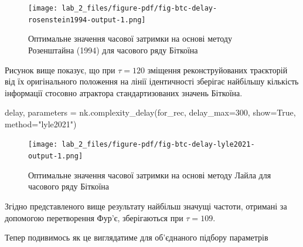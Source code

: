 \documentclass[
  letterpaper,
]{report}
\newenvironment{Shaded}{\begin{snugshade}}{\end{snugshade}}
\newcommand{\DecValTok}[1]{\textcolor[rgb]{0.68,0.00,0.00}{#1}}
\newcommand{\NormalTok}[1]{\textcolor[rgb]{0.00,0.23,0.31}{#1}}
\newcommand{\OperatorTok}[1]{\textcolor[rgb]{0.37,0.37,0.37}{#1}}
\newcommand{\StringTok}[1]{\textcolor[rgb]{0.13,0.47,0.30}{#1}}
\newcommand{\VariableTok}[1]{\textcolor[rgb]{0.07,0.07,0.07}{#1}}
\begin{document}
\begin{figure}[H]

{\centering \texttt{[image: lab\_2\_files/figure-pdf/fig-btc-delay-rosenstein1994-output-1.png]}

}

\caption{\label{fig-btc-delay-rosenstein1994}Оптимальне значення часової
затримки на основі методу Розенштайна (1994) для часового ряду Біткоїна}

\end{figure}

Рисунок вище показує, що при \(\tau=120\) зміщення реконструйованих
траєкторій від їх оригінального положення на лінії ідентичності зберігає
найбільшу кількість інформації стосовно атрактора стандартизованих
значень Біткоїна.

\begin{Shaded}
\begin{Highlighting}[]
\NormalTok{delay, parameters }\OperatorTok{=}\NormalTok{ nk.complexity\_delay(for\_rec, }
\NormalTok{                                        delay\_max}\OperatorTok{=}\DecValTok{300}\NormalTok{, show}\OperatorTok{=}\VariableTok{True}\NormalTok{,}
\NormalTok{                                        method}\OperatorTok{=}\StringTok{"lyle2021"}\NormalTok{)}
\end{Highlighting}
\end{Shaded}

\begin{figure}[H]

{\centering \texttt{[image: lab\_2\_files/figure-pdf/fig-btc-delay-lyle2021-output-1.png]}

}

\caption{\label{fig-btc-delay-lyle2021}Оптимальне значення часової
затримки на основі методу Лайла для часового ряду Біткоїна}

\end{figure}

Згідно представленого вище результату найбільш значущі частоти, отримані
за допомогою перетворення Фур'є, зберігаються при \(\tau=109\).

Тепер подивимось як це виглядатиме для об'єднаного підбору параметрів
\end{document}
